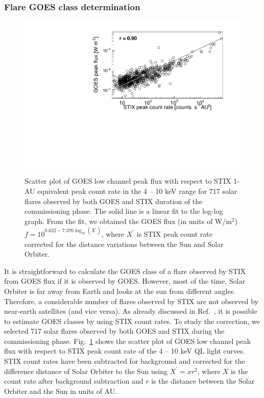 \documentclass[referee]{aa} %
\begin{document}
\subsubsection{Flare GOES class determination}
\begin{figure}
  \centering
  \includegraphics[width=0.8\linewidth]{figures/goes_stix_flux_paper.pdf}
  \caption{Scatter plot of GOES low channel peak flux with respect to STIX 1-AU equivalent  peak count rate in the 4 -- 10 keV range
  for 717 solar flares observed by both GOES and STIX duration of the commissioning phase. 
  The solid line is a linear fit to the log-log graph. 
From the fit, we obtained 
the GOES flux (in units of W/m$^2$) $f = 10^{0.622 -7.376 \log_{10} (X^{'})}$,
where $X^{'}$ is STIX peak count rate corrected for the distance variations between the Sun and Solar Orbiter. 
}
\label{fig:goes-stix}
\end{figure}
It is straightforward to calculate the GOES
class of a flare observed by STIX from GOES flux if it is observed by GOES. 
However,  most of the time, Solar Orbiter is far away from Earth and looks at 
the sun from different angles. Therefore, a considerable number of flares observed by STIX
 are not observed by near-earth satellites (and vice versa). 
As already discussed in Ref.~\cite{andrea2021}, 
it is possible to estimate GOES classes by using STIX count rates.
To study the correction, we selected 717 solar flares observed by 
both GOES  and   STIX during the commissioning phase.   
Fig.~\ref{fig:goes-stix} shows the scatter plot of GOES low channel peak flux with respect to 
STIX peak count rate of the 4 -- 10 keV QL light curves. 
STIX count rates  have been subtracted for background and corrected for 
the difference distance of Solar Orbiter to the Sun using $X^{'}=x r^2$, where $X$ is the count rate after background subtraction
 and $r$ is the distance between the Solar Orbiter and the Sun in units of AU. 
\end{document}
